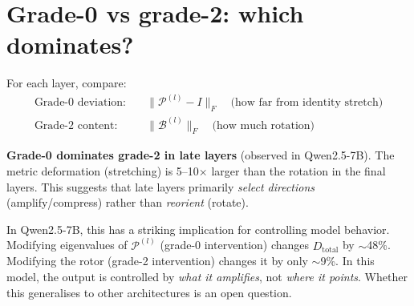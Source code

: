 \documentclass[11pt, twoside, openright]{memoir}
\newcommand{\bivec}[1]{\mathcal{B}^{(#1)}}  %
\newcommand{\metric}[1]{\mathcal{P}^{(#1)}} %
\begin{document}
\section{Grade-0 vs grade-2: which dominates?}

For each layer, compare:
\begin{align}
  \text{Grade-0 deviation:} &\quad \|\metric{l} - I\|_F
    \quad\text{(how far from identity stretch)} \\
  \text{Grade-2 content:} &\quad \|\bivec{l}\|_F
    \quad\text{(how much rotation)}
\end{align}

\begin{finding}
\textbf{Grade-0 dominates grade-2 in late layers} (observed in
Qwen2.5-7B).  The metric deformation (stretching) is
5--10$\times$ larger than the rotation in the final layers.  This
suggests that late layers primarily \emph{select directions}
(amplify/compress) rather than \emph{reorient} (rotate).
\end{finding}

\begin{transformer}
In Qwen2.5-7B, this has a striking implication for controlling model
behavior.  Modifying eigenvalues of $\metric{l}$ (grade-0 intervention)
changes $D_{\text{total}}$ by $\sim$48\%.  Modifying the rotor (grade-2
intervention) changes it by only $\sim$9\%.  In this model, the output
is controlled by \emph{what it amplifies}, not \emph{where it points}.
Whether this generalises to other architectures is an open question.
\end{transformer}
\end{document}
